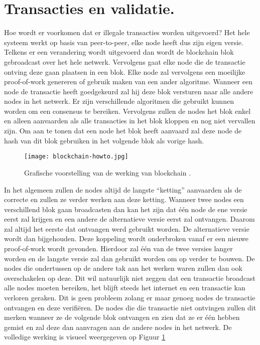 \section{Transacties en validatie.}
Hoe wordt er voorkomen dat er illegale transacties worden uitgevoerd? Het hele systeem werkt op basis van peer-to-peer, elke node heeft dus zijn eigen versie. Telkens er een verandering wordt uitgevoerd dan wordt de blockchain blok gebroadcast over het hele netwerk. Vervolgens gaat elke node die de transactie ontving deze gaan plaatsen in een blok. Elke node zal vervolgens een moeilijke proof-of-work genereren of gebruik maken van een ander algoritme. Wanneer een node de transactie heeft goedgekeurd zal hij deze blok versturen naar alle andere nodes in het netwerk. Er zijn verschillende  algoritmen die gebruikt kunnen worden om een consensus te bereiken. Vervolgens zullen de nodes het blok enkel en alleen aanvaarden als alle transacties in het blok kloppen en nog niet vervallen zijn. Om aan te tonen dat een node het blok heeft aanvaard zal deze node de hash van dit blok gebruiken in het volgende blok als vorige hash. 

\begin{figure}
	\texttt{[image: blockchain-howto.jpg]}
	\caption{Grafische voorstelling van de werking van blockchain \textcite{pwc.com}.}
	\label{fig:blockchain-howto}
\end{figure}

In het algemeen zullen de nodes altijd de langste ``ketting'' aanvaarden als de correcte en zullen ze verder werken aan deze ketting. Wanneer twee nodes een verschillend blok gaan broadcasten dan kan het zijn dat één node de ene versie eerst zal krijgen en een andere de alternatieve versie eerst zal ontvangen. Daarom zal altijd het eerste dat ontvangen werd gebruikt worden. De alternatieve versie wordt dan bijgehouden. Deze koppeling wordt onderbroken vanaf er een nieuwe proof-of-work wordt gevonden. Hierdoor zal één van de twee versies langer worden en de langste versie zal dan gebruikt worden om op verder te bouwen. De nodes die ondertussen op de andere tak aan het werken waren zullen dan ook overschakelen op deze. Dit wil natuurlijk niet zeggen dat een transactie broadcast alle nodes moeten bereiken, het blijft steeds het internet en een transactie kan verloren geraken. Dit is geen probleem zolang er maar genoeg nodes de transactie ontvangen en deze verifiëren. De nodes die die transactie niet ontvingen zullen dit merken wanneer ze de volgende blok ontvangen en zien dat ze er één hebben gemist en zal deze dan aanvragen aan de andere nodes in het netwerk. De volledige werking is visueel weergegeven op Figuur \ref{fig:blockchain-howto}

